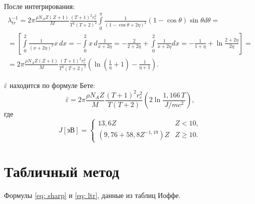 \documentclass[a4paper,12pt]{article} %
\newcommand{\eps}{\varepsilon}
\begin{document}
После интегрирования:
\begin{equation}
    \begin{gathered}
        \lambda_{tr}^{-1} =
        2 \pi \frac{\rho N_AZ(Z+1)}{M}
        \frac{(T+1)^2 r_e^2}{T^2(T+2)^2}
        \int\limits_{0}^{\pi}
        \frac{1}{(1 - \cos \theta + 2 \eta)^2} (1 - \cos \theta) \sin \theta d \theta
        = \\ =
        \left[
            \int\limits_{0}^{2} \frac{1}{(x + 2 \eta)^2} x\, dx =
            - \int\limits_{0}^{2}  x\, d\frac{1}{x + 2 \eta} =
            -\frac{2}{2 + 2 \eta} + \int\limits_{0}^{2} \frac{1}{x + 2 \eta} dx =
            -\frac{1}{1 + \eta} + \ln \frac{2 +  2 \eta}{2 \eta}
        \right]
        = \\ =
        2 \pi \frac{\rho N_AZ(Z+1)}{M}
        \frac{(T+1)^2 r_e^2}{T^2(T+2)^2}
        \left(
            \ln \left( \frac{1}{\eta} + 1 \right) - \frac{1}{\eta + 1}
        \right).
    \end{gathered}
\end{equation}

$\bar{\eps}$ находится по формуле Бете:
\begin{equation}
    \bar{\eps} =
    2 \pi \frac{\rho N_AZ}{M}
    \frac{(T+1)^2 r_e^2}{T(T+2)}
    \left(
        2 \ln
        \frac{1{,}166\,T}{J/mc^2}
    \right),
\end{equation}
где
\begin{equation}
    J [\text{эВ}] =
    \begin{cases}
        13{,}6 Z & Z<10, \\
        (9{,}76 + 58{,}8 Z^{-1{,}19}) Z & Z\geqslant 10.
    \end{cases}
\end{equation}

\section{Табличный метод}

Формулы \eqref{eq: sharp} и \eqref{eq: ltr}, данные из таблиц Иоффе.
\end{document}
